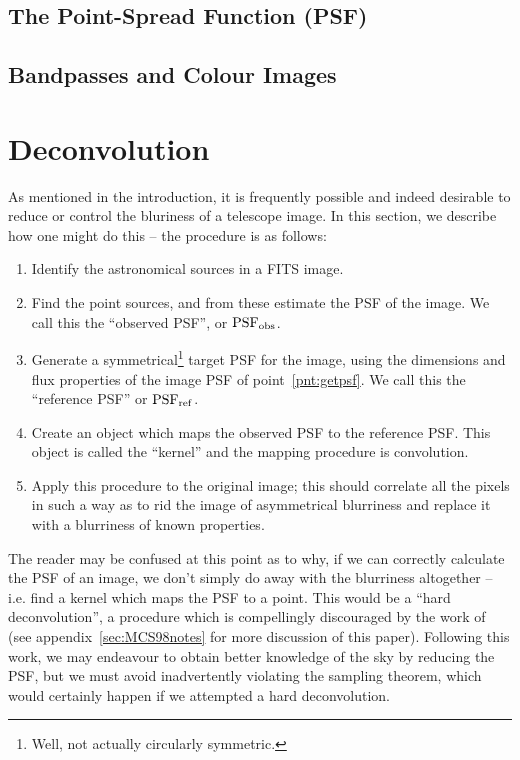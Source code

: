 \documentclass[letterpaper, 11pt]{article}
\def\psfobs{\ensuremath{{\rm PSF_{obs}}}\xspace}
\def\psfref{\ensuremath{{\rm PSF_{ref}}}\xspace}
\begin{document}
\subsection{The Point-Spread Function (PSF)}

\subsection{Bandpasses and Colour Images}

\newpage
\section{Deconvolution}
\label{sec:deconvolution}

As mentioned in the introduction, it is frequently possible and indeed desirable to reduce or control the bluriness of a telescope image. In this section, we describe how one might do this -- the procedure is as follows:

\begin{enumerate}
	\item Identify the astronomical sources in a FITS image.
	\item Find the point sources, and from these estimate the PSF of the image. We call this the ``observed PSF'', or \psfobs.\label{pnt:getpsf}
	\item Generate a symmetrical\footnote{Well, not actually circularly symmetric.} target PSF for the image, using the dimensions and flux properties of the image PSF of point~\ref{pnt:getpsf}. We call this the ``reference PSF'' or \psfref.\label{pnt:PSF0}
	\item Create an object which maps the observed PSF to the reference PSF. This object is called the ``kernel'' and the mapping procedure is convolution.
	\item Apply this procedure to the original image; this should correlate all the pixels in such a way as to rid the image of asymmetrical blurriness and replace it with a blurriness of known properties.
\end{enumerate}

The reader may be confused at this point as to why, if we can correctly calculate the PSF of an image, we don't simply do away with the blurriness altogether -- i.e. find a kernel which maps the PSF to a point. This would be a ``hard deconvolution'', a procedure which is compellingly discouraged by the work of \cite{MCS98} (see appendix~\ref{sec:MCS98notes} for more discussion of this paper). Following this work, we may endeavour to obtain better knowledge of the sky by reducing the PSF, but we must avoid inadvertently violating the sampling theorem, which would certainly happen if we attempted a hard deconvolution.
\end{document}

